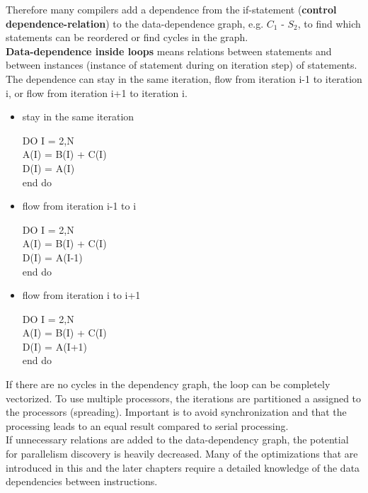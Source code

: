 \documentclass[a4paper,10pt]{article}
\begin{document}
Therefore many compilers add a dependence from the if-statement (\textbf{control dependence-relation}) to the data-dependence graph, e.g. $C_{1}$ - $S_{2}$, to find which statements can be reordered or find cycles in the graph.\\

\textbf{Data-dependence inside loops} means relations between statements and between instances (instance of statement during on iteration step) of statements. The dependence can stay in the same iteration, flow from iteration i-1 to iteration i, or flow from iteration i+1 to iteration i.\\

 \begin{itemize}
 	\item stay in the same iteration\\

\parbox{5cm}{
	  DO I = 2,N\\
	  A(I) = B(I) + C(I)\\
      D(I) = A(I)\\
      end do
}

	\item flow from iteration i-1 to i\\

\parbox{5cm}{
	  DO I = 2,N\\
	  A(I) = B(I) + C(I)\\
      D(I) = A(I-1)\\
      end do
}

     \item flow from iteration i to i+1\\

\parbox{5cm}{
	  DO I = 2,N\\
	  A(I) = B(I) + C(I)\\
      D(I) = A(I+1)\\
      end do
}

 \end{itemize}

If there are no cycles in the dependency graph, the loop can be completely vectorized. To use multiple processors, the iterations are partitioned a assigned to the processors (spreading). Important is to avoid synchronization and that the processing leads to an equal result compared to serial processing.\\
If unnecessary relations are added to the data-dependency graph, the potential for parallelism discovery is heavily decreased.
Many of the optimizations that are introduced in this and the later chapters require a detailed knowledge of the data dependencies between instructions.\\
\end{document}
